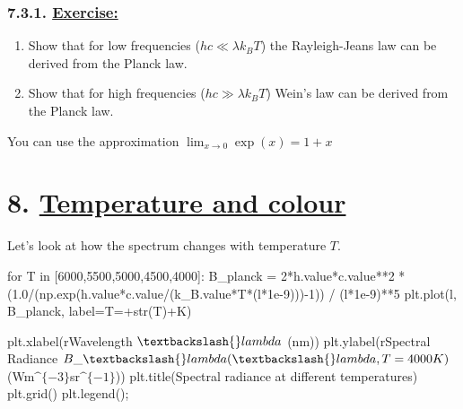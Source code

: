 \documentclass[
  letterpaper,
  DIV=11,
  numbers=noendperiod]{scrreprt}
\newenvironment{Shaded}{\begin{snugshade}}{\end{snugshade}}
\newcommand{\BuiltInTok}[1]{\textcolor[rgb]{0.00,0.23,0.31}{#1}}
\newcommand{\ControlFlowTok}[1]{\textcolor[rgb]{0.00,0.23,0.31}{#1}}
\newcommand{\DecValTok}[1]{\textcolor[rgb]{0.68,0.00,0.00}{#1}}
\newcommand{\FloatTok}[1]{\textcolor[rgb]{0.68,0.00,0.00}{#1}}
\newcommand{\KeywordTok}[1]{\textcolor[rgb]{0.00,0.23,0.31}{#1}}
\newcommand{\NormalTok}[1]{\textcolor[rgb]{0.00,0.23,0.31}{#1}}
\newcommand{\OperatorTok}[1]{\textcolor[rgb]{0.37,0.37,0.37}{#1}}
\newcommand{\StringTok}[1]{\textcolor[rgb]{0.13,0.47,0.30}{#1}}
\newcommand{\VerbatimStringTok}[1]{\textcolor[rgb]{0.13,0.47,0.30}{#1}}
\providecommand{\tightlist}{%
  \setlength{\itemsep}{0pt}\setlength{\parskip}{0pt}}\usepackage{longtable,booktabs,array}
\begin{document}
\hypertarget{exercise}{%
\subsection{\texorpdfstring{7.3.1.
\protect\hyperlink{toc0_}{Exercise:}}{7.3.1. Exercise:}}\label{exercise}}

\begin{enumerate}
\def\labelenumi{\arabic{enumi}.}
\tightlist
\item
  Show that for low frequencies (\(hc \ll \lambda k_B T\)) the
  Rayleigh-Jeans law can be derived from the Planck law.
\item
  Show that for high frequencies (\(hc \gg \lambda k_B T\)) Wein's law
  can be derived from the Planck law.
\end{enumerate}

You can use the approximation \(\lim_{x\rightarrow 0} \exp(x) = 1 + x\)

\hypertarget{temperature-and-colour}{%
\chapter{\texorpdfstring{8. \protect\hyperlink{toc0_}{Temperature and
colour}}{8. Temperature and colour}}\label{temperature-and-colour}}

Let's look at how the spectrum changes with temperature \(T\).

\begin{Shaded}
\begin{Highlighting}[]
\ControlFlowTok{for}\NormalTok{ T }\KeywordTok{in}\NormalTok{ [}\DecValTok{6000}\NormalTok{,}\DecValTok{5500}\NormalTok{,}\DecValTok{5000}\NormalTok{,}\DecValTok{4500}\NormalTok{,}\DecValTok{4000}\NormalTok{]:}
\NormalTok{    B\_planck }\OperatorTok{=} \DecValTok{2}\OperatorTok{*}\NormalTok{h.value}\OperatorTok{*}\NormalTok{c.value}\OperatorTok{**}\DecValTok{2} \OperatorTok{*}\NormalTok{ (}\FloatTok{1.0}\OperatorTok{/}\NormalTok{(np.exp(h.value}\OperatorTok{*}\NormalTok{c.value}\OperatorTok{/}\NormalTok{(k\_B.value}\OperatorTok{*}\NormalTok{T}\OperatorTok{*}\NormalTok{(l}\OperatorTok{*}\FloatTok{1e{-}9}\NormalTok{)))}\OperatorTok{{-}}\DecValTok{1}\NormalTok{)) }\OperatorTok{/}\NormalTok{ (l}\OperatorTok{*}\FloatTok{1e{-}9}\NormalTok{)}\OperatorTok{**}\DecValTok{5}
\NormalTok{    plt.plot(l, B\_planck, label}\OperatorTok{=}\StringTok{\textquotesingle{}T=\textquotesingle{}}\OperatorTok{+}\BuiltInTok{str}\NormalTok{(T)}\OperatorTok{+}\StringTok{\textquotesingle{}K\textquotesingle{}}\NormalTok{)}

\NormalTok{plt.xlabel(}\VerbatimStringTok{r\textquotesingle{}Wavelength $\textbackslash{}lambda$ (nm)\textquotesingle{}}\NormalTok{)}
\NormalTok{plt.ylabel(}\VerbatimStringTok{r\textquotesingle{}Spectral Radiance $B\_\textbackslash{}lambda(\textbackslash{}lambda, T=4000K)$ (Wm$\^{}\{{-}3\}$sr$\^{}\{{-}1\}$)\textquotesingle{}}\NormalTok{)}
\NormalTok{plt.title(}\StringTok{\textquotesingle{}Spectral radiance at different temperatures\textquotesingle{}}\NormalTok{)}
\NormalTok{plt.grid()}
\NormalTok{plt.legend()}\OperatorTok{;}
\end{Highlighting}
\end{Shaded}
\end{document}
